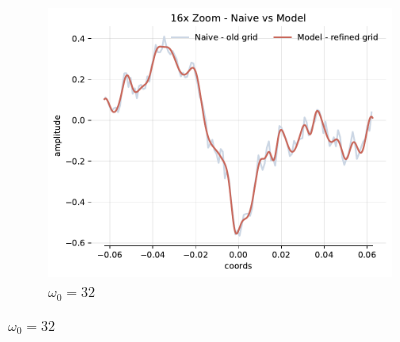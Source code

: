 \begin{figure}[h]
    \begin{subfigure}[b]{0.32\textwidth}
        \centering
        \includegraphics[width=\textwidth]{img/ch3/16x-zoom-1hl-32hf-32hz.pdf}
        \caption{$\omega_0=32$}
        \label{fig:16x-zoom-1hl-32hf-32hz}
    \end{subfigure}


\end{figure}
